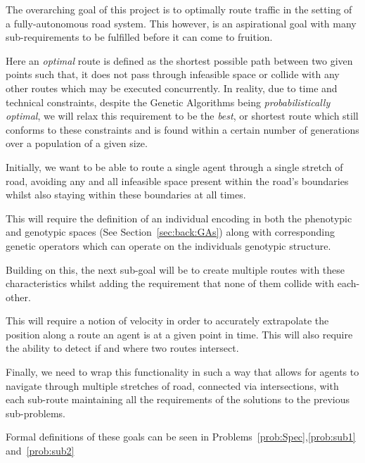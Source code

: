 The overarching goal of this project is to optimally route traffic in the setting of a fully-autonomous road system. This however, is an aspirational goal with many sub-requirements to be fulfilled before it can come to fruition.

Here an \textit{optimal} route is defined as the shortest possible path between two given points such that, it does not pass through infeasible space or collide with any other routes which may be executed concurrently. In reality, due to time and technical constraints, despite the Genetic Algorithms being \textit{probabilistically optimal}, we will relax this requirement to be the \textit{best}, or shortest route which still conforms to these constraints and is found within a certain number of generations over a population of a given size.

Initially, we want to be able to route a single agent through a single stretch of road, avoiding any and all infeasible space present within the road's boundaries whilst also staying within these boundaries at all times.

This will require the definition of an individual encoding in both the phenotypic and genotypic spaces (See Section~\ref{sec:back:GAs}) along with corresponding genetic operators which can operate on the individuals genotypic structure.

Building on this, the next sub-goal will be to create multiple routes with these characteristics whilst adding the requirement that none
of them collide with each-other.

This will require a notion of velocity in order to accurately extrapolate the position along a route an agent is at a given point in time. This will also require the ability to detect if and where two routes intersect.

Finally, we need to wrap this functionality in such a way that allows for agents to navigate through multiple stretches of road, connected via intersections, with each sub-route maintaining all the requirements of the solutions to the previous sub-problems.

Formal definitions of these goals can be seen in Problems~\ref{prob:Spec},\ref{prob:sub1} and~\ref{prob:sub2}

